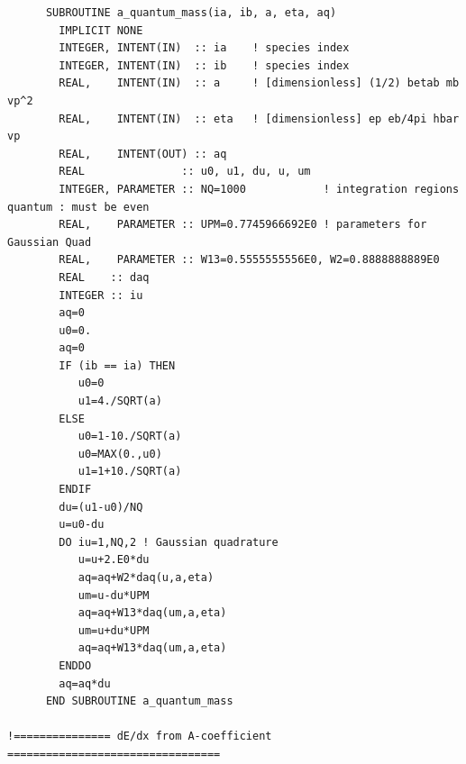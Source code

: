 \documentclass[preprint,12pt,eqsecnum,nofootinbib,amsmath,amssymb]{revtex4}
\begin{document}
{\begin{verbatim}
      SUBROUTINE a_quantum_mass(ia, ib, a, eta, aq)
        IMPLICIT NONE
        INTEGER, INTENT(IN)  :: ia    ! species index
        INTEGER, INTENT(IN)  :: ib    ! species index
        REAL,    INTENT(IN)  :: a     ! [dimensionless] (1/2) betab mb vp^2
        REAL,    INTENT(IN)  :: eta   ! [dimensionless] ep eb/4pi hbar vp
        REAL,    INTENT(OUT) :: aq 
        REAL               :: u0, u1, du, u, um
        INTEGER, PARAMETER :: NQ=1000            ! integration regions quantum : must be even
        REAL,    PARAMETER :: UPM=0.7745966692E0 ! parameters for Gaussian Quad
        REAL,    PARAMETER :: W13=0.5555555556E0, W2=0.8888888889E0
        REAL    :: daq
        INTEGER :: iu
        aq=0
        u0=0.
        aq=0
        IF (ib == ia) THEN
           u0=0
           u1=4./SQRT(a)
        ELSE
           u0=1-10./SQRT(a)
           u0=MAX(0.,u0)  
           u1=1+10./SQRT(a)
        ENDIF
        du=(u1-u0)/NQ
        u=u0-du
        DO iu=1,NQ,2 ! Gaussian quadrature
           u=u+2.E0*du
           aq=aq+W2*daq(u,a,eta)
           um=u-du*UPM
           aq=aq+W13*daq(um,a,eta)
           um=u+du*UPM
           aq=aq+W13*daq(um,a,eta)
        ENDDO
        aq=aq*du
      END SUBROUTINE a_quantum_mass

!=============== dE/dx from A-coefficient =================================


\end{verbatim}}
\end{document}
